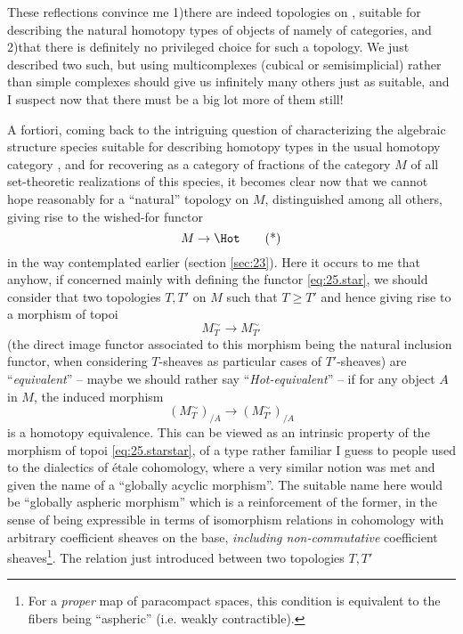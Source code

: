 These reflections convince me 1)\enspace there are indeed topologies
on \Cat{}, suitable for describing the natural homotopy types of
objects of \Cat{} namely of categories, and 2)\enspace that there is
definitely no privileged choice for such a topology. We
just described two such, but using multicomplexes (cubical or
semisimplicial) rather than simple complexes should give us infinitely
many others just as suitable, and I suspect now that there must be a
big lot more of them still!

\label{sec:25}%
A fortiori, coming back to the intriguing question of characterizing
the algebraic structure species suitable for describing homotopy types
in the usual homotopy category \Hot{}, and for recovering \Hot{} as a
category of fractions of the category $M$ of all set-theoretic
realizations of this species, it becomes clear now that we cannot hope
reasonably for a ``natural'' topology on $M$, distinguished among all
others, giving rise to the wished-for functor
\begin{equation}
  \label{eq:25.star}
  M \to \Hot \tag{*}
\end{equation}
in the way contemplated earlier (section \ref{sec:23}). Here it occurs to me
that anyhow, if concerned mainly with defining the functor
\eqref{eq:25.star}, we should consider that two topologies $T,T'$ on
$M$ such that $T \ge T'$ and hence giving rise to a morphism of topoi
\begin{equation}
  \label{eq:25.starstar}
  M_T^\sim \to M_{T'}^\sim \tag{**}
\end{equation}
(the direct image functor associated to this morphism being the
natural inclusion functor, when considering $T$-sheaves as particular
cases of $T'$-sheaves) are ``\emph{equivalent}'' -- maybe we should
rather say ``\emph{Hot-equivalent}'' -- if for any object $A$ in $M$, the
induced morphism
\[ (M_T^\sim)_{/A} \to (M_{T'}^\sim)_{/A} \]
is a homotopy equivalence. This can be viewed as an intrinsic property
of the morphism of topoi \eqref{eq:25.starstar}, of a type rather
familiar I guess to people used to the dialectics of \'etale
cohomology, where a very similar notion was met and given the name of
a ``globally acyclic morphism''. The suitable name here would be
``globally aspheric morphism'' which is a reinforcement of the former,
in the sense of being expressible in terms of isomorphism relations in
cohomology with arbitrary coefficient sheaves on the base,
\emph{including non-commutative} coefficient sheaves\footnote{For a \emph{proper} map of paracompact spaces, this condition is equivalent to the fibers being ``aspheric'' (i.e. weakly contractible).}. The relation just introduced between two topologies $T,T'$
